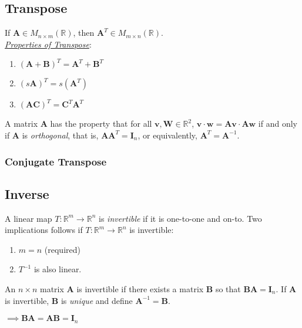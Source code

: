 \subsection{Transpose}
If $\bm{A}\in M_{n\times m}(\mathbb{R})$, then $\bm{A}^T\in M_{m\times n}(\mathbb{R})$.\\

\noindent\underline{\textit{Properties of Transpose}}:
\begin{enumerate}[label=\theenumi)]
    \item $(\bm{A}+\bm{B})^T = \bm{A}^T+\bm{B}^T$
    \item $(s\bm{A})^T = s(\bm{A}^T)$
    \item $(\bm{AC})^T = \bm{C}^T\bm{A}^T$
\end{enumerate}

\begin{theorem}
A matrix $\bm{A}$ has the property that for all $\bm{v}, \bm{W}\in\mathbb{R}^2$, $\bm{v}\cdot\bm{w}=\bm{Av}\cdot\bm{Aw}$ if and only if $\bm{A}$ is \emph{orthogonal}, that is, $\bm{AA}^T=\bm{I}_n$, or equivalently, $\bm{A}^T=\bm{A}^{-1}$. 
\end{theorem}

\subsubsection{Conjugate Transpose}

\subsection{Inverse}
\begin{definition}[Invertibility]
 A linear map $T:\mathbb{R}^m\rightarrow\mathbb{R}^n$ is \emph{invertible} if it is one-to-one and on-to. 
Two implications follows if 
    $T:\mathbb{R}^m\rightarrow\mathbb{R}^n$ is invertible:
    \begin{enumerate}[label=\theenumi)]
        \item $m=n$ (required)
        \item $T^{-1}$ is also linear.
    \end{enumerate}
\end{definition}

\begin{theorem}
An $n\times n$ matrix $\bm{A}$ is invertible if there exists a matrix $\bm{B}$ so that $\bm{BA}=\bm{I}_n$. If $\bm{A}$ is invertible, $\bm{B}$ is \emph{unique} and define $\bm{A}^{-1}=\bm{B}$.
\end{theorem}
$\implies \bm{BA}=\bm{AB}=\bm{I}_n$\\

